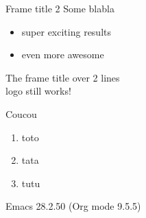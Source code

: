 \documentclass[presentation, aspectratio=169]{beamer}
\begin{document}
\begin{frame}[label={sec:org30c1741}]{Frame title 2}
Some blabla
\begin{itemize}
\item super exciting results
\item even more awesome
\end{itemize}
\end{frame}

\begin{frame}[label={sec:org4c56f1e}]{The frame title over 2 lines \\  logo still works!}
\begin{exampleblock}{Coucou}
\begin{enumerate}
\item toto
\item tata
\item tutu
\end{enumerate}
\end{exampleblock}
\end{frame}
Emacs 28.2.50 (Org mode 9.5.5)
\end{document}
